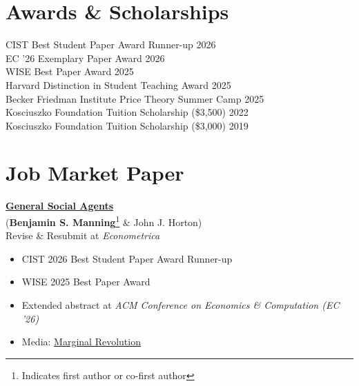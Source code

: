 \documentclass[margin,line,pifont,palatino,courier, 9pt]{res}
\begin{document}
\begin{resume}
\section{\sc Awards \& Scholarships}
CIST Best Student Paper Award Runner-up \hfill 2026 \\
EC '26 Exemplary Paper Award \hfill 2026 \\
WISE Best Paper Award \hfill 2025 \\
Harvard Distinction in Student Teaching Award \hfill 2025 \\
Becker Friedman Institute Price Theory Summer Camp \hfill 2025 \\
Kosciuszko Foundation Tuition Scholarship (\$3,500) \hfill 2022 \\
Kosciuszko Foundation Tuition Scholarship (\$3,000) \hfill 2019 


\section{\sc Job Market Paper}

\href{https://benjaminmanning.io/files/general_social_agents.pdf}{\bf General Social Agents}\\
(\textbf{Benjamin S. Manning}\footnote{Indicates first author or co-first author} \& John J. Horton)\\
Revise \& Resubmit at \textit{Econometrica}
\vspace{0.25cm}
\begin{itemize}
\item CIST 2026 Best Student Paper Award Runner-up
\item WISE 2025 Best Paper Award
\item Extended abstract at \textit{ACM Conference on Economics \& Computation (EC '26)}
\item Media: \href{https://marginalrevolution.com/marginalrevolution/2025/09/pathbreaking-paper-on-ai-simulations-of-human-behavior.html}{Marginal Revolution}
\end{itemize}
\vspace{-0.25cm}


\end{resume}
\end{document}
